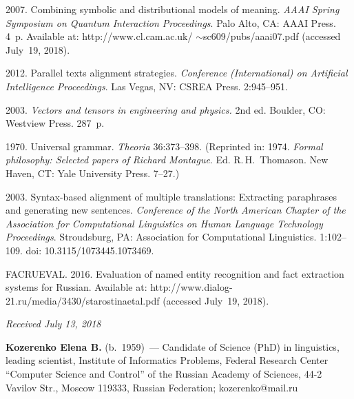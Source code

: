 \begin{multicols}{2}
{{\begin{thebibliography}{99}
 2007. Combining symbolic and distributional 
models of meaning. \textit{AAAI Spring Symposium on Quantum Interaction Proceedings}. 
Palo Alto, CA: AAAI Press. 4~p. Available at: 
{\sf http://www.cl.cam.ac.uk/ $\sim$sc609/pubs/aaai07.pdf} (accessed July~19, 2018).

  2012. Parallel texts alignment strategies. 
\textit{Conference (International) on Artificial Intelligence Proceedings}. 
Las Vegas, NV: CSREA Press. 2:945--951.

 2003. \textit{Vectors and tensors in engineering and 
physics.} 2nd ed. Boulder, CO: Westview Press. 287~p.

 1970. Universal grammar. \textit{Theoria} 36:373--398. 
(Reprinted in: 1974.
\textit{Formal philosophy: Selected papers of Richard Montague}. 
Ed. R.\,H.~Thomason. New Haven, CT: Yale University Press. 7--27.)

 2003. Syntax-based alignment of 
multiple translations: Extracting paraphrases and generating new sentences. 
\textit{Conference of the North American Chapter of the Association for 
Computational Linguistics on Human Language Technology Proceedings}. 
Stroudsburg, PA: Association 
for Computational Linguistics. 1:102--109. doi: 10.3115/1073445.1073469.

FACRUEVAL. 2016. Evaluation of named entity recognition and fact extraction 
systems for Russian. Available at: {\sf http://www.dialog-21.ru/media/3430/\linebreak starostinaetal.pdf} 
(accessed July~19, 2018).

\end{thebibliography}

 }
 }

\end{multicols}

\vspace*{-6pt}

\hfill{\small\textit{Received July 13, 2018}}

\pagebreak

     
     \Contr
     
     \noindent
     \textbf{Kozerenko Elena B.} (b.\ 1959)~--- Candidate of Science (PhD) in linguistics, leading scientist, 
Institute of Informatics Problems, Federal Research Center ``Computer Science and Control'' of the Russian 
Academy of Sciences,  44-2 Vavilov Str., Moscow 119333, Russian Federation; \mbox{kozerenko@mail.ru} 
      
